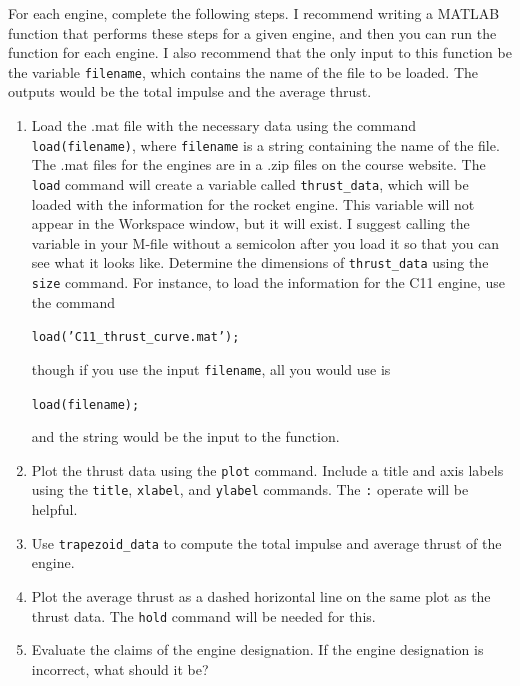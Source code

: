\documentclass[11pt]{article}
\begin{document}
For each engine, complete the following steps.  I recommend writing a MATLAB function that performs these steps for a given engine, and then you can run the function for each engine.  I also recommend that the only input to this function be the variable \texttt{filename}, which contains the name of the file to be loaded.  The outputs would be the total impulse and the average thrust.

	\begin{enumerate}
	
	\item  Load the .mat file with the necessary data using the command \texttt{load(filename)}, where \texttt{filename} is a string containing the name of the file.  The .mat files for the engines are in a .zip files on the course website.  The \texttt{load} command will create a variable called \texttt{thrust\_data}, which will be loaded with the information for the rocket engine.  This variable will not appear in the Workspace window, but it will exist.  I suggest calling the variable in your M-file without a semicolon after you load it so that you can see what it looks like.  Determine the dimensions of \texttt{thrust\_data} using the \texttt{size} command.  For instance, to load the information for the C11 engine, use the command
	
		\texttt{load('C11\_thrust\_curve.mat');}
		
		though if you use the input \texttt{filename}, all you would use is
		
		\texttt{load(filename);}
		
		and the string would be the input to the function.
	
	\item  Plot the thrust data using the \texttt{plot} command.  Include a title and axis labels using the \texttt{title}, \texttt{xlabel}, and \texttt{ylabel} commands.  The \texttt{:} operate will be helpful.
	
	\item  Use \texttt{trapezoid\_data} to compute the total impulse and average thrust of the engine.
	
	\item  Plot the average thrust as a dashed horizontal line on the same plot as the thrust data.  The \texttt{hold} command will be needed for this.
	
	\item  Evaluate the claims of the engine designation.  If the engine designation is incorrect, what should it be?
	
	\end{enumerate}
	
\end{document}
